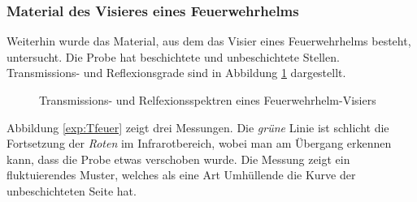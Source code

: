     \subsubsection{Material des Visieres eines Feuerwehrhelms}
        Weiterhin wurde das Material, aus dem das Visier eines Feuerwehrhelms besteht, untersucht. Die Probe hat beschichtete und unbeschichtete Stellen. Transmissions- und Reflexionsgrade sind in Abbildung \ref{exp:feuerwehr} dargestellt.
        \begin{figure}[htbp]
            \caption{Transmissions- und Relfexionsspektren eines Feuerwehrhelm-Visiers}
            \label{exp:feuerwehr}
        \end{figure}
        Abbildung \ref{exp:Tfeuer} zeigt drei Messungen. Die \textit{grüne} Linie ist schlicht die Fortsetzung der \textit{Roten} im Infrarotbereich, wobei man am Übergang erkennen kann, dass die Probe etwas verschoben wurde. Die Messung zeigt ein fluktuierendes Muster, welches als eine Art Umhüllende die Kurve der unbeschichteten Seite hat.
